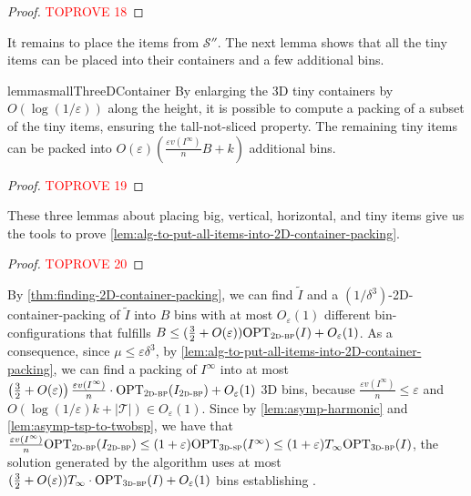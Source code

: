 \documentclass[a4paper,UKenglish,cleveref, autoref, thm-restate]{lipics-v2021}
\newcommand{\eps}{\varepsilon}
\newcommand{\opt}{\mathrm{OPT}}
\newcommand{\twobp}{\textsc{2d-bp}\xspace}
\newcommand{\tbp}{\textsc{3d-bp}\xspace}
\newcommand{\tsp}{\textsc{3d-sp}\xspace}
\newcommand{\bigy}{big\xspace}
\newcommand{\tin}{tiny\xspace}
\begin{document}
\begin{proof}\textcolor{red}{TOPROVE 18}\end{proof}

It remains to place the items from $\mathcal{S}''$. The next lemma shows that all the \tin items can be placed into their containers and a few additional bins.

\begin{restatable}{lemma}{smallThreeDContainer}
    By enlarging the 3D tiny containers by $O(\log (1/\eps))$ along the height, it is possible to compute a packing of a subset of the tiny items, ensuring the tall-not-sliced property. The remaining tiny items can be packed into $O(\eps)(\frac{\eps v(I^{\infty})}{n}B+k)$ additional bins.
\end{restatable}
\begin{proof}\textcolor{red}{TOPROVE 19}\end{proof}

These three lemmas about placing \bigy, vertical, horizontal, and \tin items give us the tools to prove \cref{lem:alg-to-put-all-items-into-2D-container-packing}.

\begin{proof}\textcolor{red}{TOPROVE 20}\end{proof}


By \cref{thm:finding-2D-container-packing}, we can find $\tilde{I}$ and a $(1/\delta^3)$-2D-container-packing of $\tilde{I}$ into $B$ bins with at most $O_{\eps}(1)$ different bin-configurations that fulfills $B \leq (\frac{3}{2}+O(\eps))\opt_{\twobp}(I) +O_{\eps}(1)$.
As a consequence, since $\mu \leq \eps \delta^3$, by \cref{lem:alg-to-put-all-items-into-2D-container-packing}, we can find a packing of $I^\infty$ into at most 
$
\left(\frac{3}{2}+O(\eps)\right)\frac{\eps v(I^{\infty})}{n}\cdot \opt_{\twobp}(I_{\twobp}) + O_{\eps}(1)
$
3D bins, because $\frac{\eps v(I^{\infty})}{n} \leq \eps$ and $O(\log(1/\eps)k +|\mathcal{T}|) \in O_{\eps}(1)$.
Since by \cref{lem:asymp-harmonic} and \cref{lem:asymp-tsp-to-twobsp}, we have that 
$\frac{\eps v(I^{\infty})}{n}\opt_{\twobp}(I_{\twobp})  
\leq (1+\eps)\opt_{\tsp}(I^{\infty}) 
\leq (1+\eps)T_{\infty}\opt_{\tbp}(I)$,
the solution generated by the algorithm uses at most $(\frac{3}{2}+O(\eps))T_{\infty}\cdot \opt_{\tbp}(I) + O_{\eps}(1)$ bins
establishing .
\end{document}
